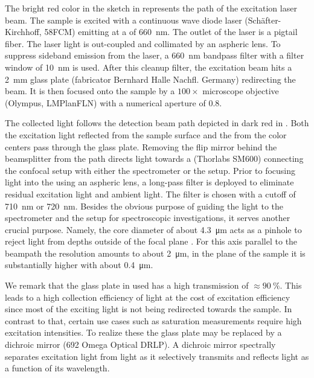		The bright red color in the sketch in  represents the path of the excitation laser beam.
		The sample is excited with a continuous wave diode laser (Sch\"after-Kirchhoff, 58FCM) emitting at a \wl of \SI{660}{\nano\meter}.
		The outlet of the laser is a pigtail fiber.
		The laser light is out-coupled and collimated by an aspheric lens.
		To suppress sideband emission from the laser, a \SI{660}{\nm} bandpass filter with a filter window of \SI{10}{\nm} is used.
		After this cleanup filter, the excitation beam hits a \SI{2}{\milli\meter} glass plate (fabricator Bernhard Halle Nachfl. Germany) redirecting the beam. It is then focused onto the sample by a $100 \times$ microscope objective (Olympus, LMPlanFLN) with a numerical aperture of $0.8$.

		The collected light follows the detection beam path depicted in dark red in .
		Both the excitation light reflected from the sample surface and the \fl from the color centers pass through the glass plate.
		Removing the flip mirror behind the beamsplitter from the path directs light towards a \smf (Thorlabs SM600) connecting the confocal setup with either the spectrometer or the \hbt setup. Prior to focusing light into the \smf using an aspheric lens, a long-pass filter is deployed to eliminate residual excitation light and ambient light.
		The filter is chosen with a cutoff \wl of \SI{710}{\nm} or \SI{720}{\nm}.
		Besides the obvious purpose of guiding the \pl light to the spectrometer and the \HBT setup for spectroscopic investigations, it serves another crucial purpose. 
		Namely, the core diameter of about \SI{4.3}{\micro\meter} acts as a pinhole to reject \pl light from depths outside of the focal plane \cite{Santori2010}.
		For this axis parallel to the beampath the resolution amounts to about \SI{2}{\micro\meter}, in the plane of the sample it is substantially higher with about \SI{0.4}{\micro\meter}.

		We remark that the glass plate in used  has a high transmission of $\approx \SI{90}{\percent}$. This leads to a high collection efficiency of \fl light at the cost of excitation efficiency since most of the exciting light is not being redirected towards the sample. In contrast to that, certain use cases such as saturation measurements require high excitation intensities. To realize these the glass plate may be replaced by a dichroic mirror (692 Omega Optical DRLP). A dichroic mirror spectrally separates excitation light from \pl light as it selectively transmits and reflects light as a function of its wavelength.

